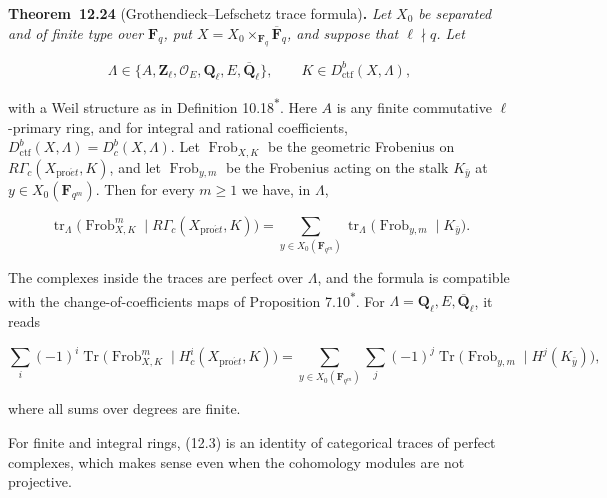 \documentclass[11pt]{article}
\newenvironment{bpstatement}[2]{\par\addvspace{0.6\baselineskip}\noindent\textbf{#1}#2\textbf{.}\enspace\ignorespaces}
  {\par\addvspace{0.4\baselineskip}}
\newenvironment{bpstatementit}[2]{\begin{bpstatement}{#1}{#2}\itshape\ignorespaces}{\end{bpstatement}}
\newcommand{\bpout}[1]{#1\textsuperscript{\hyperlink{bp-outside}{\ensuremath{\ast}}}}
\providecommand{\Dbc}{}\renewcommand{\Dbc}{D^b_c}
\begin{document}
\label{bp73}%
\begin{bpstatementit}{Theorem~12.24}{ (Grothendieck–Lefschetz trace formula)}
Let \(X_0\) be separated and of finite type over \(\mathbf F_q\), put \(X=X_0\times_{\mathbf F_q}\overline{\mathbf F}_q\), and suppose that \(\ell\nmid q\). Let

\[
\Lambda\in\{A,\mathbf Z_\ell,\mathcal O_E,\mathbf Q_\ell,E,\overline{\mathbf Q}_\ell\},
\qquad K\in D^b_{\mathrm{ctf}}(X,\Lambda),
\]

with a Weil structure as in Definition \bpout{10.18}. Here \(A\) is any finite commutative \(\ell\)-primary ring, and for integral and rational coefficients, \(D^b_{\mathrm{ctf}}(X,\Lambda)=\Dbc(X,\Lambda)\). Let \(\operatorname{Frob}_{X,K}\) be the geometric Frobenius on \(R\Gamma_c(X_{\mathrm{pro}\acute{e}t},K)\), and let \(\operatorname{Frob}_{y,m}\) be the Frobenius acting on the stalk \(K_{\bar y}\) at \(y\in X_0(\mathbf F_{q^m})\). Then for every \(m\geq1\) we have, in \(\Lambda\),

\[
\operatorname{tr}_{\Lambda}
\bigl(\operatorname{Frob}_{X,K}^m\mid R\Gamma_c(X_{\mathrm{pro}\acute{e}t},K)\bigr)
=\sum_{y\in X_0(\mathbf F_{q^m})}
\operatorname{tr}_{\Lambda}
\bigl(\operatorname{Frob}_{y,m}\mid K_{\bar y}\bigr).
\tag{12.3}
\]

The complexes inside the traces are perfect over \(\Lambda\), and the formula is compatible with the change-of-coefficients maps of Proposition \bpout{7.10}. For \(\Lambda=\mathbf Q_\ell,E,\overline{\mathbf Q}_\ell\), it reads

\[
\sum_i(-1)^i\operatorname{Tr}
\bigl(\operatorname{Frob}_{X,K}^m\mid H_c^i(X_{\mathrm{pro}\acute{e}t},K)\bigr)
=\sum_{y\in X_0(\mathbf F_{q^m})}\sum_j(-1)^j
\operatorname{Tr}\bigl(\operatorname{Frob}_{y,m}\mid H^j(K_{\bar y})\bigr),
\tag{12.4}
\]

where all sums over degrees are finite.
\end{bpstatementit}

\label{bp74}%
For finite and integral rings, (12.3) is an identity of categorical traces of perfect complexes, which makes sense even when the cohomology modules are not projective.
\end{document}
